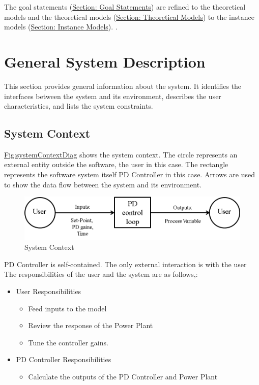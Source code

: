 \documentclass[12pt]{article}
\begin{document}
The goal statements (\hyperref[Sec:GoalStmt]{Section: Goal Statements}) are refined to the theoretical models and the theoretical models (\hyperref[Sec:TMs]{Section: Theoretical Models}) to the instance models (\hyperref[Sec:IMs]{Section: Instance Models}). .

\section{General System Description}
\label{Sec:GenSysDesc}
This section provides general information about the system. It identifies the interfaces between the system and its environment, describes the user characteristics, and lists the system constraints.

\subsection{System Context}
\label{Sec:SysContext}
\hyperref[Figure:systemContextDiag]{Fig:systemContextDiag} shows the system context. The circle represents an external entity outside the software, the user in this case. The rectangle represents the software system itself PD Controller in this case. Arrows are used to show the data flow between the system and its environment.

\begin{figure}
\begin{center}
\includegraphics[width=\textwidth]{../../../datafiles/PIDController/Fig_SystemContext.png}
\caption{System Context}
\label{Figure:systemContextDiag}
\end{center}
\end{figure}
PD Controller  is self-contained. The only external interaction is   with the  user The responsibilities of the  user  and the  system  are as follows,:

\begin{itemize}
\item{User Responsibilities}
\begin{itemize}
\item{Feed inputs to the model}
\item{Review the response of the  Power Plant}
\item{Tune the controller gains.}
\end{itemize}
\item{PD Controller Responsibilities}
\begin{itemize}
\item{Calculate the outputs of the  PD Controller  and  Power Plant}
\end{itemize}
\end{itemize}
\end{document}
